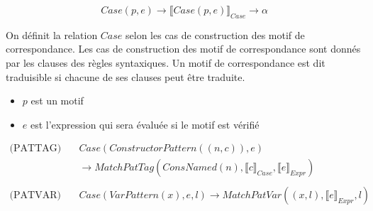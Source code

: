 \documentclass[
  12pt,
]{article}
\providecommand{\tightlist}{%
  \setlength{\itemsep}{0pt}\setlength{\parskip}{0pt}}
\begin{document}
\[ Case(p,e) \rightarrow \llbracket Case(p,e) \rrbracket_{Case} \rightarrow \alpha \]

On définit la relation \({Case}\) selon les cas de construction
des motif de correspondance. Les cas de construction des motif de
correspondance sont donnés par les clauses des règles syntaxiques. Un
motif de correspondance est dit traduisible si chacune de ses clauses
peut être traduite.
\begin{itemize}
  \tightlist
  \item
        \(p\) est un motif
  \item
        \(e\) est l'expression qui sera évaluée si le motif est vérifié
\end{itemize}
\begin{align*}
  \text{(PATTAG)} \quad & Case(ConstructorPattern((n,c)), e)
  \\ &\rightarrow  MatchPatTag(ConsNamed(n), \llbracket c \rrbracket_{Case}, \llbracket e \rrbracket_{Expr})        \\
  \\
  \text{(PATVAR)} \quad & Case(VarPattern(x), e, l)
  \rightarrow  MatchPatVar((x, l), \llbracket e \rrbracket_{Expr}, l)
\end{align*}
\end{document}
